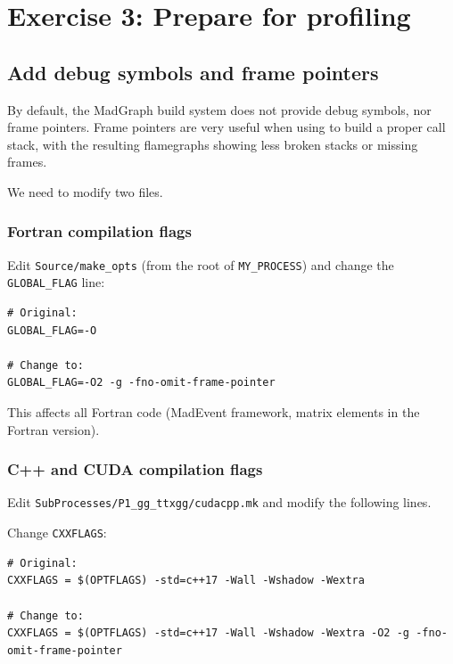 \documentclass[11pt,a4paper]{article}
\begin{document}
\section{Exercise 3: Prepare for profiling}
\label{sec:prepare}

\subsection{Add debug symbols and frame pointers}

By default, the MadGraph build system does not provide debug symbols, nor frame pointers.
Frame pointers are very useful when using \perf to build a proper call stack, with the resulting flamegraphs showing less broken stacks or missing frames.

We need to modify two files.

\subsubsection{Fortran compilation flags}

Edit \texttt{Source/make\_opts} (from the root of \texttt{MY\_PROCESS}) and change the \texttt{GLOBAL\_FLAG} line:

\begin{lstlisting}[style=diffstyle]
# Original:
GLOBAL_FLAG=-O

# Change to:
GLOBAL_FLAG=-O2 -g -fno-omit-frame-pointer
\end{lstlisting}

This affects all Fortran code (MadEvent framework, matrix elements in the Fortran version).

\subsubsection{C++ and CUDA compilation flags}

Edit \texttt{SubProcesses/P1\_gg\_ttxgg/cudacpp.mk} and modify the following lines.

Change \texttt{CXXFLAGS}:
\begin{lstlisting}[style=diffstyle]
# Original:
CXXFLAGS = $(OPTFLAGS) -std=c++17 -Wall -Wshadow -Wextra

# Change to:
CXXFLAGS = $(OPTFLAGS) -std=c++17 -Wall -Wshadow -Wextra -O2 -g -fno-omit-frame-pointer
\end{lstlisting}
\end{document}
